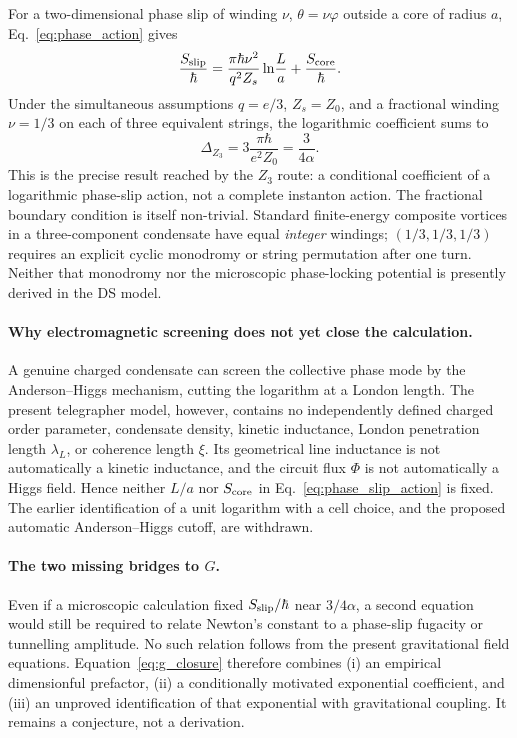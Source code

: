 \documentclass[11pt,a4paper]{article}
\theoremstyle{plain}
\theoremstyle{remark}
\begin{document}
For a two-dimensional phase slip of winding $\nu$, $\theta=\nu\varphi$ outside a core of radius $a$, Eq.~\eqref{eq:phase_action} gives
\begin{equation}
\frac{S_{\rm slip}}{\hbar}=\frac{\pi\hbar\nu^2}{q^2Z_s}\ln\!\frac{L}{a}+\frac{S_{\rm core}}{\hbar}.
\label{eq:phase_slip_action}
\end{equation}
Under the simultaneous assumptions $q=e/3$, $Z_s=Z_0$, and a fractional winding $\nu=1/3$ on each of three equivalent strings, the logarithmic coefficient sums to
\begin{equation}
\Delta_{Z_3}=3\frac{\pi\hbar}{e^2Z_0}=\frac{3}{4\alpha}.
\label{eq:z3_coefficient}
\end{equation}
This is the precise result reached by the $Z_3$ route: a conditional coefficient of a logarithmic phase-slip action, not a complete instanton action. The fractional boundary condition is itself non-trivial. Standard finite-energy composite vortices in a three-component condensate have equal \emph{integer} windings; $(1/3,1/3,1/3)$ requires an explicit cyclic monodromy or string permutation after one turn. Neither that monodromy nor the microscopic phase-locking potential is presently derived in the DS model.

\paragraph{Why electromagnetic screening does not yet close the calculation.} A genuine charged condensate can screen the collective phase mode by the Anderson--Higgs mechanism, cutting the logarithm at a London length. The present telegrapher model, however, contains no independently defined charged order parameter, condensate density, kinetic inductance, London penetration length $\lambda_L$, or coherence length $\xi$. Its geometrical line inductance is not automatically a kinetic inductance, and the circuit flux $\Phi$ is not automatically a Higgs field. Hence neither $L/a$ nor $S_{\rm core}$ in Eq.~\eqref{eq:phase_slip_action} is fixed. The earlier identification of a unit logarithm with a cell choice, and the proposed automatic Anderson--Higgs cutoff, are withdrawn.

\paragraph{The two missing bridges to $G$.} Even if a microscopic calculation fixed $S_{\rm slip}/\hbar$ near $3/4\alpha$, a second equation would still be required to relate Newton's constant to a phase-slip fugacity or tunnelling amplitude. No such relation follows from the present gravitational field equations. Equation~\eqref{eq:g_closure} therefore combines (i) an empirical dimensionful prefactor, (ii) a conditionally motivated exponential coefficient, and (iii) an unproved identification of that exponential with gravitational coupling. It remains a conjecture, not a derivation.
\end{document}
